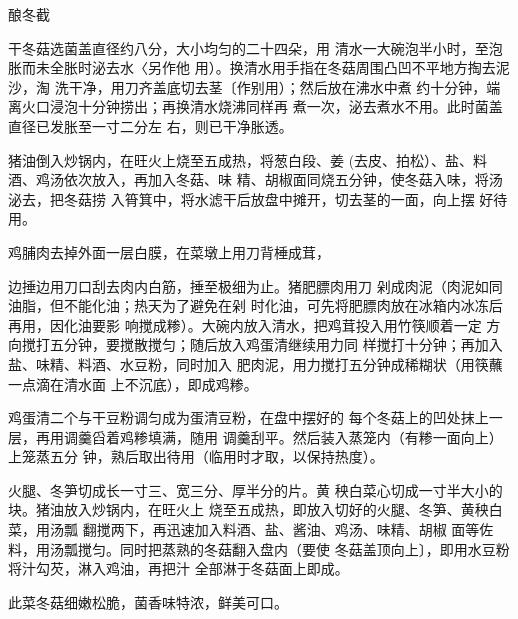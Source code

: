 \begin{recipe}{酿冬截}

\ingredients


\cooking

\step 干冬菇选菌盖直径约八分，大小均匀的二十四朵，用 清水一大碗泡半小时，至泡胀而未全胀时泌去水〈另作他 用）。换清水用手指在冬菇周围凸凹不平地方掏去泥沙，淘 洗干净，用刀齐盖底切去茎〔作别用）；然后放在沸水中煮 约十分钟，端离火口浸泡十分钟捞出；再换清水烧沸同样再 煮一次，泌去煮水不用。此时菌盖直径已发胀至一寸二分左 右，则已干净胀透。

猪油倒入炒锅内，在旺火上烧至五成热，将葱白段、姜 (去皮、拍松）、盐、料酒、鸡汤依次放入，再加入冬菇、味 精、胡椒面同烧五分钟，使冬菇入味，将汤泌去，把冬菇捞 入筲箕中，将水滤干后放盘中摊开，切去茎的一面，向上摆 好待用。

\step 鸡脯肉去掉外面一层白膜，在菜墩上用刀背棰成茸，

边捶边用刀口刮去肉内白筋，捶至极细为止。猪肥膘肉用刀 剁成肉泥（肉泥如同油脂，但不能化油；热天为了避免在剁 时化油，可先将肥膘肉放在冰箱内冰冻后再用，因化油要影 响搅成糁）。大碗内放入清水，把鸡茸投入用竹筷顺着一定 方向搅打五分钟，要搅散搅匀；随后放入鸡蛋清继续用力同 样搅打十分钟；再加入盐、味精、料酒、水豆粉，同时加入 肥肉泥，用力搅打五分钟成稀糊状（用筷蘸一点滴在清水面 上不沉底），即成鸡糁。

鸡蛋清二个与干豆粉调匀成为蛋清豆粉，在盘中摆好的 每个冬菇上的凹处抹上一层，再用调羹舀着鸡糁填满，随用 调羹刮平。然后装入蒸笼内（有糁一面向上）上笼蒸五分 钟，熟后取出待用（临用时才取，以保持热度）。

\step 火腿、冬笋切成长一寸三、宽三分、厚半分的片。黄 秧白菜心切成一寸半大小的块。猪油放入炒锅内，在旺火上 烧至五成热，即放入切好的火腿、冬笋、黄秧白菜，用汤瓢 翻搅两下，再迅速加入料酒、盐、酱油、鸡汤、味精、胡椒 面等佐料，用汤瓢搅匀。同时把蒸熟的冬菇翻入盘内（要使 冬菇盖顶向上〕，即用水豆粉将汁勾芡，淋入鸡油，再把汁 全部淋于冬菇面上即成。

\notes

此菜冬菇细嫩松脆，菌香味特浓，鲜美可口。

\end{recipe}

